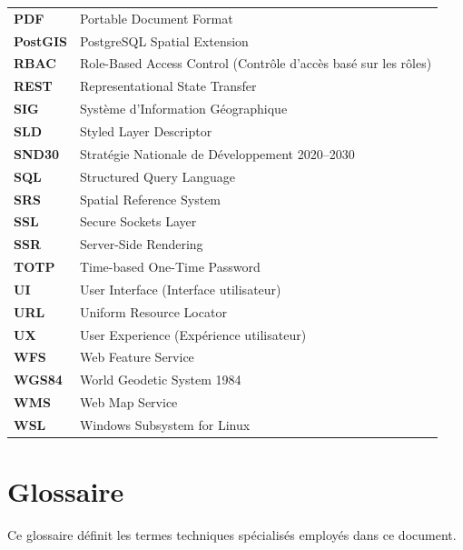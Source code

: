 \documentclass[12pt, a4paper]{report}
\begin{document}
\begin{tabular}{%
  >{\bfseries}p{3.2cm}%
  p{10.8cm}}
  PDF     & Portable Document Format \\
  PostGIS & PostgreSQL Spatial Extension \\
  \rowcolor{eeclightgreen!60}
  RBAC    & Role-Based Access Control (Contrôle d'accès basé sur les rôles) \\
  REST    & Representational State Transfer \\
  \rowcolor{eeclightgreen!60}
  SIG     & Système d'Information Géographique \\
  SLD     & Styled Layer Descriptor \\
  \rowcolor{eeclightgreen!60}
  SND30   & Stratégie Nationale de Développement 2020--2030 \\
  SQL     & Structured Query Language \\
  \rowcolor{eeclightgreen!60}
  SRS     & Spatial Reference System \\
  SSL     & Secure Sockets Layer \\
  \rowcolor{eeclightgreen!60}
  SSR     & Server-Side Rendering \\
  TOTP    & Time-based One-Time Password \\
  \rowcolor{eeclightgreen!60}
  UI      & User Interface (Interface utilisateur) \\
  URL     & Uniform Resource Locator \\
  \rowcolor{eeclightgreen!60}
  UX      & User Experience (Expérience utilisateur) \\
  WFS     & Web Feature Service \\
  \rowcolor{eeclightgreen!60}
  WGS84   & World Geodetic System 1984 \\
  WMS     & Web Map Service \\
  \rowcolor{eeclightgreen!60}
  WSL     & Windows Subsystem for Linux \\
\end{tabular}
\endgroup

\clearpage

\chapter*{Glossaire}

\noindent
Ce glossaire définit les termes techniques spécialisés employés dans ce document.
\end{document}
